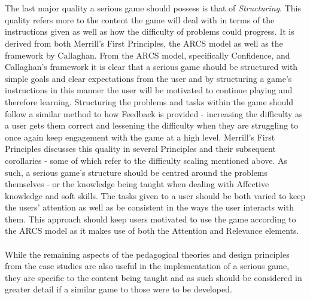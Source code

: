 \documentclass[conference]{IEEEtran}
\begin{document}
\\\\
The last major quality a serious game should possess is that of \textit{Structuring}. This quality refers more to the content the game will deal with in terms of the instructions given as well as how the difficulty of problems could progress. It is derived from both Merrill's First Principles\cite{Merrill2002}, the ARCS model\cite{keller1987development} as well as the framework by Callaghan\cite{callaghan2018}. From the ARCS model\cite{keller1987development}, specifically Confidence, and Callaghan's\cite{callaghan2018} framework it is clear that a serious game should be structured with simple goals and clear expectations from the user and by structuring a game's instructions in this manner the user will be motivated to continue playing and therefore learning. Structuring the problems and tasks within the game should follow a similar method to how Feedback is provided - increasing the difficulty as a user gets them correct and lessening the difficulty when they are struggling to once again keep engagement with the game at a high level. Merrill's First Principles\cite{Merrill2002} discusses this quality in several Principles and their subsequent corollaries - some of which refer to the difficulty scaling mentioned above. As such, a serious game's structure should be centred around the problems themselves - or the knowledge being taught when dealing with Affective knowledge and soft skills. The tasks given to a user should be both varied to keep the users' attention as well as be consistent in the ways the user interacts with them. This approach should keep users motivated to use the game according to the ARCS model\cite{keller1987development} as it makes use of both the Attention and Relevance elements.
\\\\
While the remaining aspects of the pedagogical theories and design principles from the case studies are also useful in the implementation of a serious game, they are specific to the content being taught and as such should be considered in greater detail if a similar game to those were to be developed.
\end{document}
